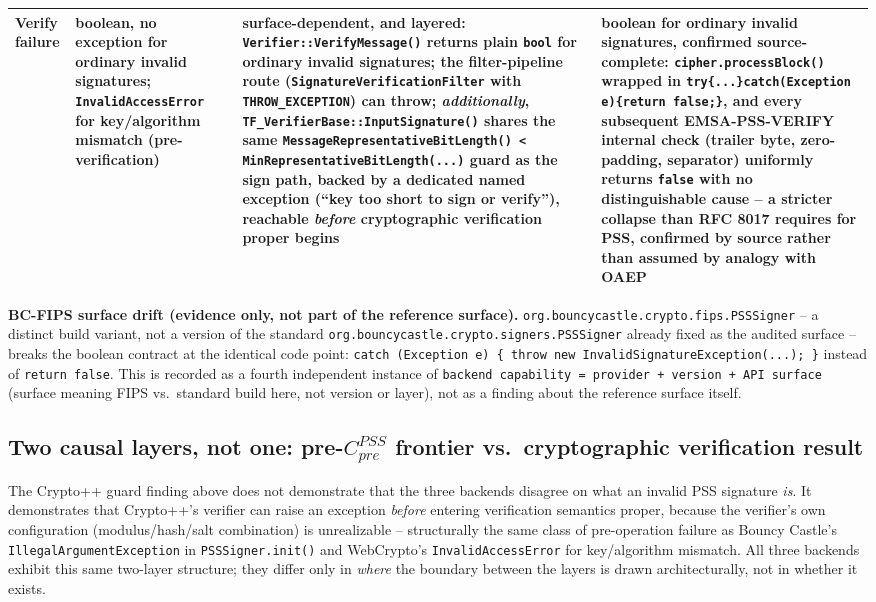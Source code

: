 \documentclass[11pt,a4paper]{article}
\begin{document}
\begin{center}
\begin{tabularx}{\textwidth}{@{}l>{\raggedright\arraybackslash}X>{\raggedright\arraybackslash}X>{\raggedright\arraybackslash}X@{}}
Verify failure & boolean, no exception for ordinary invalid signatures; \texttt{InvalidAccessError} for key/algorithm mismatch (pre-verification) & \textbf{surface-dependent, and layered}: \texttt{Verifier::VerifyMessage()} returns plain \texttt{bool} for ordinary invalid signatures; the filter-pipeline route (\texttt{SignatureVerificationFilter} with \texttt{THROW\_EXCEPTION}) can throw; \emph{additionally}, \texttt{TF\_VerifierBase::InputSignature()} shares the same \texttt{MessageRepresentativeBitLength() < MinRepresentativeBitLength(...)} guard as the sign path, backed by a dedicated named exception (``key too short to sign or verify''), reachable \emph{before} cryptographic verification proper begins & boolean for ordinary invalid signatures, confirmed source-complete: \texttt{cipher.processBlock()} wrapped in \texttt{try\{...\}catch(Exception e)\{return false;\}}, and every subsequent EMSA-PSS-VERIFY internal check (trailer byte, zero-padding, separator) uniformly returns \texttt{false} with no distinguishable cause -- a stricter collapse than RFC 8017 requires for PSS, confirmed by source rather than assumed by analogy with OAEP \\
\bottomrule
\end{tabularx}
\end{center}

\textbf{BC-FIPS surface drift (evidence only, not part of the reference surface).} \texttt{org.bouncycastle.crypto.fips.PSSSigner} -- a distinct build variant, not a version of the standard \texttt{org.bouncycastle.crypto.signers.PSSSigner} already fixed as the audited surface -- breaks the boolean contract at the identical code point: \texttt{catch (Exception e) \{ throw new InvalidSignatureException(...); \}} instead of \texttt{return false}. This is recorded as a fourth independent instance of \texttt{backend capability = provider + version + API surface} (surface meaning FIPS vs.\ standard build here, not version or layer), not as a finding about the reference surface itself.

\subsection{Two causal layers, not one: pre-\texorpdfstring{$C_{pre}^{PSS}$}{Cpre} frontier vs.\ cryptographic verification result}
The Crypto++ guard finding above does not demonstrate that the three backends disagree on what an invalid PSS signature \emph{is}. It demonstrates that Crypto++'s verifier can raise an exception \emph{before} entering verification semantics proper, because the verifier's own configuration (modulus/hash/salt combination) is unrealizable -- structurally the same class of pre-operation failure as Bouncy Castle's \texttt{IllegalArgumentException} in \texttt{PSSSigner.init()} and WebCrypto's \texttt{InvalidAccessError} for key/algorithm mismatch. All three backends exhibit this same two-layer structure; they differ only in \emph{where} the boundary between the layers is drawn architecturally, not in whether it exists.
\end{document}

